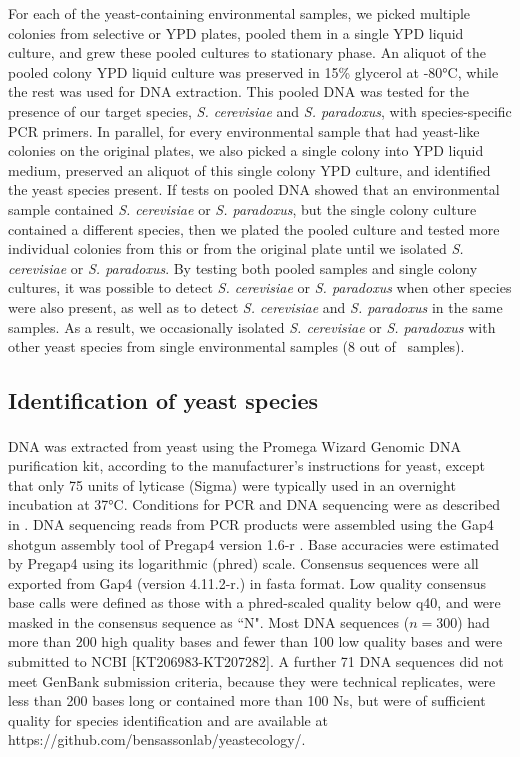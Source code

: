 \documentclass[12pt]{article}
\begin{document}
\begin{linenumbers}
For each of the yeast-containing environmental samples, we picked multiple colonies from selective or YPD plates, pooled them in a single YPD liquid culture, and grew these pooled cultures to stationary phase. An aliquot of the pooled colony YPD liquid culture was preserved in 15\% glycerol at -80\si{\degreeCelsius}, while the rest was used for DNA extraction. This pooled DNA was tested for the presence of our target species, \textit{S. cerevisiae} and \textit{S. paradoxus}, with species-specific PCR primers. In parallel, for every environmental sample that had yeast-like colonies on the original plates, we also picked a single colony into YPD liquid medium, preserved an aliquot of this single colony YPD culture, and identified the yeast species present. If tests on pooled DNA showed that an environmental sample contained \textit{S. cerevisiae} or \textit{S. paradoxus}, but the single colony culture contained a different species, then we plated the pooled culture and tested more individual colonies from this or from the original plate until we isolated \textit{S. cerevisiae} or \textit{S. paradoxus}. By testing both pooled samples and single colony cultures, it was possible to detect \textit{S. cerevisiae} or \textit{S. paradoxus} when other species were also present, as well as to detect \textit{S. cerevisiae} and \textit{S. paradoxus} in the same samples. As a result, we occasionally isolated \textit{S. cerevisiae} or \textit{S. paradoxus} with other yeast species from single environmental samples (8 out of \samplecount\ samples). 

\subsection*{Identification of yeast species}

DNA was extracted from yeast using the Promega Wizard\textsuperscript{\textregistered} Genomic DNA purification kit, according to the manufacturer's instructions for yeast, except that only 75 units of lyticase (Sigma) were typically used in an overnight incubation at 37\si{\degreeCelsius}. Conditions for PCR and DNA sequencing were as described in \citet{bensasson_evidence_2011}. DNA sequencing reads from PCR products were assembled using the Gap4 shotgun assembly tool of Pregap4 version 1.6-r \citep{bonfield_new_1995}. Base accuracies were estimated by Pregap4 using its logarithmic (phred) scale. Consensus sequences were all exported from Gap4 (version 4.11.2-r.) in fasta format. Low quality consensus base calls were defined as those with a phred-scaled quality below q40, and were masked in the consensus sequence as ``N". Most DNA sequences ($n=300$) had more than 200 high quality bases and fewer than 100 low quality bases and were submitted to NCBI [KT206983-KT207282]. A further 71 DNA sequences did not meet GenBank submission criteria, because they were technical replicates, were less than 200 bases long or contained more than 100 Ns, but were of sufficient quality for species identification and are available at https://github.com/bensassonlab/yeastecology/. 


\end{linenumbers}
\end{document}
